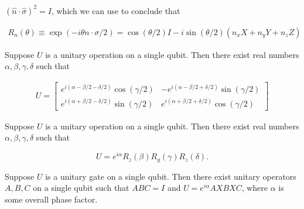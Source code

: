 \documentclass[main.tex]{subfiles}
\begin{document}
\begin{proposition} $(\hat{n} \cdot \hat{\sigma} ) ^2 = I$, which we can use to conclude that

\begin{align*}
R_n(\theta) \equiv \exp(-i \theta n \cdot \sigma / 2) = \cos(\theta /2) I - i \sin(\theta / 2) (n_x X + n_y Y + n_z Z)
\end{align*}

%
%
%
%
\end{proposition}

\begin{lemma}\label{4.12}
Suppose $U$ is a unitary operation on a single qubit. Then there exist real numbers $\alpha, \beta, \gamma, \delta$ such that

\begin{align*}
	U = \begin{bmatrix}
 	e^{i(\alpha - \beta / 2 - \delta / 2)} \cos ( \gamma / 2) & -e^{i (\alpha - \beta /2 + \delta / 2)} \sin(\gamma / 2) \\
 	e^{i(\alpha + \beta / 2 - \delta / 2)} \sin ( \gamma / 2) & e^{i (\alpha + \beta /2 + \delta / 2)} \cos(\gamma / 2)
 \end{bmatrix}
\end{align*}
\end{lemma}

\begin{theorem}
Suppose $U$ is a unitary operation on a single qubit. Then there exist real numbers $\alpha, \beta, \gamma, \delta$ such that

$$
U = e^{i\alpha}R_z(\beta)R_y(\gamma)R_z(\delta).
$$
\end{theorem}

\begin{corollary}\label{4.2}
	Suppose $U$ is a unitary gate on a single qubit. Then there exist unitary operators $A, B, C$ on a single qubit such that $ABC = I$ and $U = e^{i\alpha}AXBXC$, where $\alpha$ is some overall phase factor.
\end{corollary}
\end{document}
